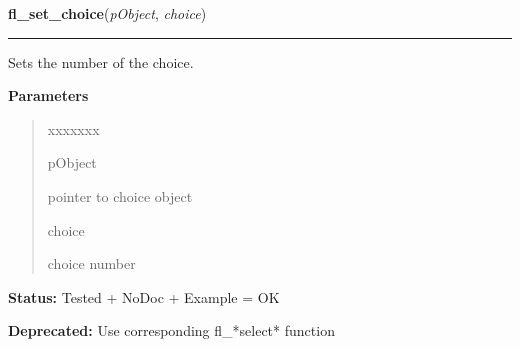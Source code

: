 \hspace{.8\funcindent}\begin{boxedminipage}{\funcwidth}

    \raggedright \textbf{fl\_set\_choice}(\textit{pObject}, \textit{choice})

    \vspace{-1.5ex}

    \rule{\textwidth}{0.5\fboxrule}
\setlength{\parskip}{2ex}
    Sets the number of the choice.

\setlength{\parskip}{1ex}
      \textbf{Parameters}
      \vspace{-1ex}

      \begin{quote}
        \begin{Ventry}{xxxxxxx}

          \item[pObject]

          pointer to choice object

          \item[choice]

          choice number

        \end{Ventry}

      \end{quote}

\textbf{Status:} Tested + NoDoc + Example = OK



\textbf{Deprecated:} Use corresponding fl\_*select* function



    \end{boxedminipage}

    \label{xformslib:deprecated:fl_set_choice_text}

    \vspace{0.5ex}

